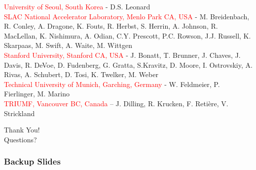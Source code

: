\documentclass{beamer}
\begin{document}
\begin{frame}
{\textcolor{red}{University of Seoul, South Korea}  -  D.S. Leonard\\
\textcolor{red}{SLAC National Accelerator Laboratory, Menlo Park CA, USA}  -  M. Breidenbach, R. Conley, A. Dragone, K. Fouts, R. Herbst, S. Herrin, A. Johnson, R. MacLellan, K. Nishimura, A. Odian, C.Y. Prescott, P.C. Rowson, J.J. Russell, K. Skarpaas, M. Swift, A. Waite, M. Wittgen\\
\textcolor{red}{Stanford University, Stanford CA, USA}  -  J. Bonatt, T. Brunner, J. Chaves, J. Davis, R. DeVoe, D. Fudenberg, G. Gratta, S.Kravitz, D. Moore, I. Ostrovskiy, 
A. Rivas, A. Schubert, D. Tosi, K. Twelker, M. Weber\\
\textcolor{red}{Technical University of Munich, Garching, Germany}  -  W. Feldmeier, P. Fierlinger,  M. Marino\\
\textcolor{red}{TRIUMF, Vancouver BC, Canada} – J. Dilling, R. Krucken, F. Reti\`ere, V. Strickland\\
}

\end{frame}

\begin{frame}
\begin{center}
{\Huge Thank You!\\[\baselineskip]

Questions?}
\end{center}
\end{frame}




\begin{frame}
\frametitle{Backup Slides}
\end{frame}
\end{document}
